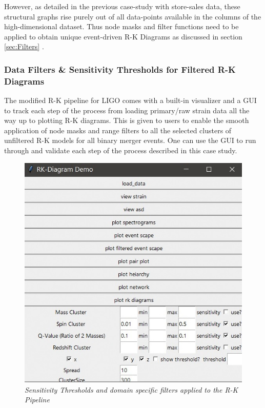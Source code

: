 However, as detailed in the previous case-study with store-sales data, these structural graphs rise purely out of all data-points available in the columns of the high-dimensional dataset. Thus node masks and filter functions need to be applied to obtain unique event-driven R-K Diagrams as discussed in section \ref{sec:Filters} .

\subsubsection{Data Filters \& Sensitivity Thresholds for Filtered R-K Diagrams}

The modified R-K pipeline for LIGO comes with a built-in visualizer and a GUI to track each step of the process from loading primary/raw strain data all the way up to plotting R-K diagrams. This is given to users to enable the smooth application of node masks and range filters to all the selected clusters of unfiltered R-K models for all binary merger events. One can use the GUI to run through and validate each step of the process described in this case study. 

    \begin{figure}[H]
        \centering
        \includegraphics[width=1.0\linewidth]{images/71_00_Sensitivity Thresholds.jpg}
        \caption{\textit{Sensitivity Thresholds and domain specific filters applied to the R-K Pipeline }}
        \label{fig:LIGO13_PlaceHolder_fig}
    \end{figure}

